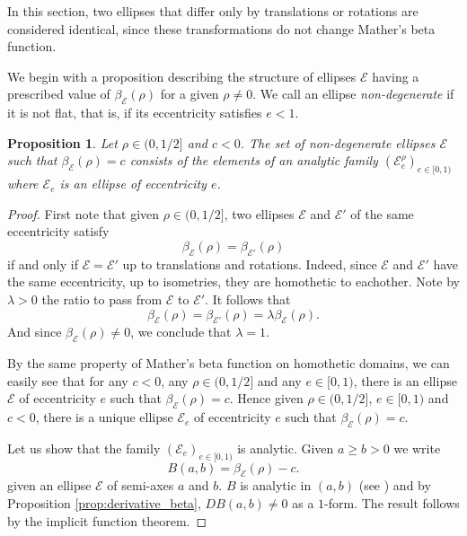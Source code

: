 \documentclass[a4paper]{article}
\newtheorem{proposition}{Proposition}
\theoremstyle{definition}
\begin{document}
In this section, two ellipses that differ only by translations or rotations are considered identical, since these transformations do not change Mather's beta function.

We begin with a proposition describing the structure of ellipses $\mathscr E$ having a prescribed value of $\beta_{\mathscr E}(\rho)$ for a given $\rho\neq 0$. We call an ellipse \textit{non-degenerate} if it is not flat, that is, if its eccentricity satisfies $e<1$.

\begin{proposition}
\label{prop:structure_ellipses_beta_fixed}
Let $\rho\in(0,1/2]$ and $c<0$. The set of non-degenerate ellipses $\mathscr E$ such that $\beta_{\mathscr E}(\rho) = c$ consists of the elements of an analytic family $(\mathscr E_e^{\rho})_{e\in[0,1)}$ where
$\mathscr E_e$ is an ellipse of eccentricity $e$.
\end{proposition}

\begin{proof}
First note that given $\rho\in(0,1/2]$, two ellipses $\mathscr E$ and $\mathscr E'$ of the same eccentricity satisfy
\[
\beta_{\mathscr E}(\rho) = \beta_{\mathscr E'}(\rho)
\]
if and only if $\mathscr E=\mathscr E'$ up to translations and rotations. Indeed, since $\mathscr E$ and $\mathscr E'$ have the same eccentricity, up to isometries, they are homothetic to eachother. Note by $\lambda>0$ the ratio to pass from $\mathscr E$ to $\mathscr E'$. It follows that 
\[
\beta_{\mathscr E}(\rho) = \beta_{\mathscr E'}(\rho) = \lambda\beta_{\mathscr E}(\rho).
\]
And since $\beta_{\mathscr E}(\rho) \neq 0$, we conclude that $\lambda=1$.

By the same property of Mather's beta function on homothetic domains, we can easily see that for any $c<0$, any $\rho\in(0,1/2]$ and any $e\in[0,1)$, there is an ellipse $\mathscr E$ of eccentricity $e$ such that $\beta_{\mathscr E}(\rho) = c$. Hence given $\rho\in(0,1/2]$, $e\in[0,1)$ and $c<0$, there is a unique ellipse $\mathscr E_e$ of eccentricity $e$ such that $\beta_{\mathscr E}(\rho) = c$.

Let us show that the family $(\mathscr E_e)_{e\in[0,1)}$ is analytic. Given $a\geq b>0$ we write 
\[
B(a,b) = \beta_{\mathscr E}(\rho)-c.
\]
given an ellipse $\mathscr E$ of semi-axes $a$ and $b$. $B$ is analytic in $(a,b)$ (see \cite{Bialyellipses}) and by Proposition \ref{prop:derivative_beta}, $DB(a,b)\neq 0$ as a $1$-form. The result follows by the implicit function theorem.
\end{proof}
\end{document}
